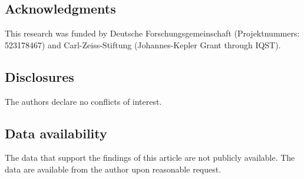 \documentclass[%
 reprint,
 amsmath,amssymb,
 aps,
prl,
]{revtex4-2}
\begin{document}
\begin{acknowledgments}
\subsection{Acknowledgments}
This research was funded by Deutsche Forschungsgemeinschaft (Projektnummers: 523178467) and Carl-Zeiss-Stiftung (Johannes-Kepler Grant through IQST).

\subsection{Disclosures}
The authors declare no conflicts of interest.


\subsection{Data availability}

The data that support the findings of this article are not publicly available. The data are available from the author upon reasonable request.


\end{acknowledgments}








 
\end{document}
